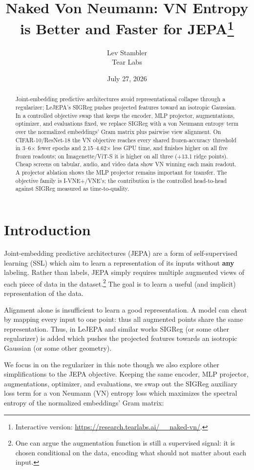 \documentclass[11pt]{article}
\title{Naked Von Neumann: VN Entropy is Better and Faster for JEPA\thanks{Interactive version: \url{https://research.tearlabs.ai/__naked-vn/}.}}
\author{Lev Stambler\\ Tear Labs}
\date{July 27, 2026}
\begin{document}
\maketitle

\begin{abstract}
Joint-embedding predictive architectures avoid representational collapse through a regularizer; LeJEPA's SIGReg pushes projected features toward an isotropic Gaussian. In a controlled objective swap that keeps the encoder, MLP projector, augmentations, optimizer, and evaluations fixed, we replace SIGReg with a von Neumann entropy term over the normalized embeddings' Gram matrix plus pairwise view alignment. On CIFAR-10/ResNet-18 the VN objective reaches every shared frozen-accuracy threshold in 3--6\(\times\) fewer epochs and 2.15--4.62\(\times\) less GPU time, and finishes higher on all five frozen readouts; on Imagenette/ViT-S it is higher on all three (+13.1 ridge points). Cheap screens on tabular, audio, and video data show VN winning each main readout. A projector ablation shows the MLP projector remains important for transfer. The objective family is I-VNE+/VNE's; the contribution is the controlled head-to-head against SIGReg measured as time-to-quality.
\end{abstract}

\section{Introduction}
\label{sec:introduction}

Joint-embedding predictive architectures (JEPA)\cite{ref14,ref15} are a form of self-supervised learning (SSL) which aim to learn a representation of its inputs without \textbf{any} labeling. Rather than labels, JEPA simply requires multiple augmented views of each piece of data in the dataset.\footnote{One can argue the augmentation function is still a supervised signal: it is chosen conditional on the data, encoding what should not matter about each input.}
The goal is to learn a useful (and implicit) representation of the data.

Alignment alone is insufficient to learn a good representation. A model can cheat by mapping every input to one point: thus all augmented points share the same representation.
Thus, in LeJEPA\cite{ref1} and similar works\cite{ref5,ref6,ref7} SIGReg (or some other regularizer) is added which pushes the projected features towards an isotropic Gaussian (or some other geometry).

We focus in on the regularizer in this note though we also explore other simplifications to the JEPA objective.
Keeping the same encoder, MLP projector, augmentations, optimizer, and evaluations, we swap out the SIGReg auxiliary loss term for a von Neumann (VN) entropy loss which maximizes the spectral entropy of the normalized embeddings' Gram matrix:
\end{document}
